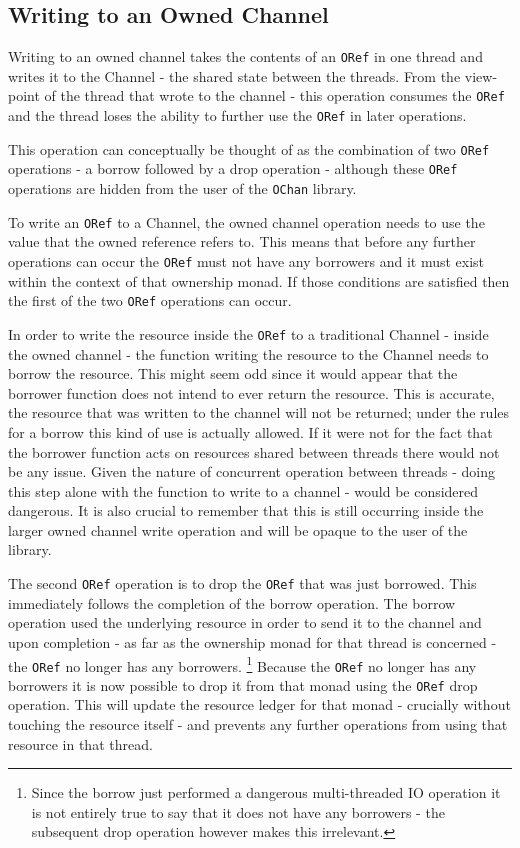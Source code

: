 \documentclass[onehalf,11pt]{beavtex}
\begin{document}
\subsection{Writing to an Owned Channel}

Writing to an owned channel takes the contents of an \texttt{ORef} in
one thread and writes it to the Channel - the shared state between the threads.
From the view-point of the thread that wrote to the channel - this operation
consumes the \texttt{ORef} and the thread loses the ability to further use the
\texttt{ORef} in later operations.

This operation can conceptually be thought of as the combination of two
\texttt{ORef} operations - a borrow followed by a drop operation -
although these \texttt{ORef} operations are hidden from the user of the
\texttt{OChan} library.

To write an \texttt{ORef} to a Channel, the owned channel operation
needs to use the value that the owned reference refers to.  This means
that before any further operations can occur the \texttt{ORef} must not have any
borrowers and it must exist within the context of that ownership monad.
If those conditions are satisfied then the first of the two \texttt{ORef}
operations can occur.

In order to write the resource inside the \texttt{ORef} to a traditional Channel
- inside the owned channel - the function writing the resource to the
Channel needs to borrow the resource.
This might seem odd since it would appear that the borrower function does not
intend to ever return the resource.  This is accurate, the resource that was
written to the channel will not be returned; under the rules for a
borrow this kind of use is actually allowed.  If it were not for the fact that
the borrower function acts on resources shared between threads there would not be
any issue.  Given the nature of concurrent operation between threads - doing
this step alone with the function to write to a channel - would be considered
dangerous.  It is also crucial to remember that this is still occurring inside
the larger owned channel write operation and will be opaque to the user
of the library.

The second \texttt{ORef} operation is to drop the \texttt{ORef} that was just
borrowed. This immediately follows the completion of the borrow operation. The
borrow operation used the underlying resource in order to send it to the channel
and upon completion - as far as the ownership monad for that thread is
concerned - the \texttt{ORef} no longer has any borrowers.
\footnote{Since the borrow just performed a dangerous multi-threaded IO operation
  it is not entirely true to say that it does not have any borrowers - the
  subsequent drop operation however makes this irrelevant.}
Because the \texttt{ORef} no longer has any borrowers it is now possible to
drop it from that monad using the \texttt{ORef} drop operation.  This will
update the resource ledger for that monad - crucially without touching the
resource itself - and prevents any further operations from using that resource
in that thread.
\end{document}
